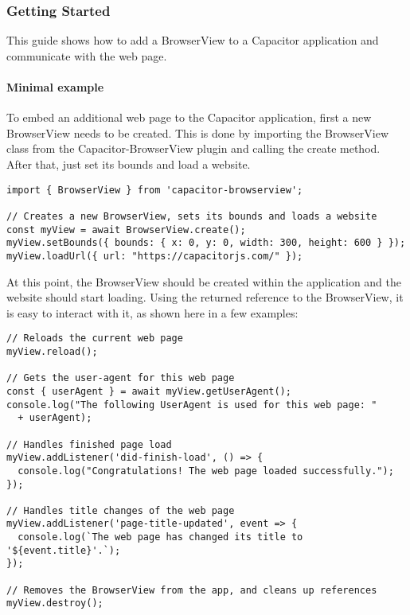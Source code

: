\subsubsection{Getting Started}
\label{sec:Capacitor-BrowserView:GettingStarted}

This guide shows how to add a BrowserView to a Capacitor application and communicate with the web page.

\paragraph{Minimal example}
\label{sec:Capacitor-BrowserView:MinimalExample}

To embed an additional web page to the Capacitor application, first a new BrowserView needs to be created.
This is done by importing the BrowserView class from the Capacitor-BrowserView plugin and calling the create method.
After that, just set its bounds and load a website.

\begin{verbatim}
import { BrowserView } from 'capacitor-browserview';

// Creates a new BrowserView, sets its bounds and loads a website
const myView = await BrowserView.create();
myView.setBounds({ bounds: { x: 0, y: 0, width: 300, height: 600 } });
myView.loadUrl({ url: "https://capacitorjs.com/" });
\end{verbatim}

At this point, the BrowserView should be created within the application and the website should start loading.
Using the returned reference to the BrowserView, it is easy to interact with it, as shown here in a few examples:

\begin{verbatim}
// Reloads the current web page
myView.reload();

// Gets the user-agent for this web page
const { userAgent } = await myView.getUserAgent();
console.log("The following UserAgent is used for this web page: "
  + userAgent);

// Handles finished page load
myView.addListener('did-finish-load', () => {
  console.log("Congratulations! The web page loaded successfully.");
});

// Handles title changes of the web page
myView.addListener('page-title-updated', event => {
  console.log(`The web page has changed its title to '${event.title}'.`);
});

// Removes the BrowserView from the app, and cleans up references
myView.destroy();
\end{verbatim}

